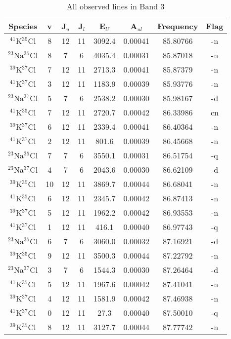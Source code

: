 \begin{table*}[htp]
\centering
\caption{All observed lines in Band 3}
\begin{tabular}{cccccccc}
\label{tab:all_detections_B3}
Species & v & J$_u$ & J$_l$ & E$_U$ & A$_{ul}$ & Frequency & Flag \\
\hline
$^{41}$K$^{35}$Cl & 8 & 12 & 11 & 3092.4 & 0.00041 & 85.80766 & -n \\
$^{23}$Na$^{35}$Cl & 8 & 7 & 6 & 4035.4 & 0.00031 & 85.87018 & -n \\
$^{39}$K$^{37}$Cl & 7 & 12 & 11 & 2713.3 & 0.00041 & 85.87379 & -n \\
$^{41}$K$^{37}$Cl & 3 & 12 & 11 & 1183.9 & 0.00039 & 85.93776 & -n \\
$^{23}$Na$^{37}$Cl & 5 & 7 & 6 & 2538.2 & 0.00030 & 85.98167 & -d \\
$^{41}$K$^{35}$Cl & 7 & 12 & 11 & 2720.7 & 0.00042 & 86.33986 & cn \\
$^{39}$K$^{37}$Cl & 6 & 12 & 11 & 2339.4 & 0.00041 & 86.40364 & -n \\
$^{41}$K$^{37}$Cl & 2 & 12 & 11 & 801.6 & 0.00039 & 86.45668 & -n \\
$^{23}$Na$^{35}$Cl & 7 & 7 & 6 & 3550.1 & 0.00031 & 86.51754 & -q \\
$^{23}$Na$^{37}$Cl & 4 & 7 & 6 & 2043.6 & 0.00030 & 86.62109 & -d \\
$^{39}$K$^{35}$Cl & 10 & 12 & 11 & 3869.7 & 0.00044 & 86.68041 & -n \\
$^{41}$K$^{35}$Cl & 6 & 12 & 11 & 2345.7 & 0.00042 & 86.87413 & -n \\
$^{39}$K$^{37}$Cl & 5 & 12 & 11 & 1962.2 & 0.00042 & 86.93553 & -n \\
$^{41}$K$^{37}$Cl & 1 & 12 & 11 & 416.1 & 0.00040 & 86.97743 & -q \\
$^{23}$Na$^{35}$Cl & 6 & 7 & 6 & 3060.0 & 0.00032 & 87.16921 & -d \\
$^{39}$K$^{35}$Cl & 9 & 12 & 11 & 3500.3 & 0.00044 & 87.22792 & -n \\
$^{23}$Na$^{37}$Cl & 3 & 7 & 6 & 1544.3 & 0.00030 & 87.26464 & -d \\
$^{41}$K$^{35}$Cl & 5 & 12 & 11 & 1967.6 & 0.00042 & 87.41041 & -n \\
$^{39}$K$^{37}$Cl & 4 & 12 & 11 & 1581.9 & 0.00042 & 87.46938 & -n \\
$^{41}$K$^{37}$Cl & 0 & 12 & 11 & 27.3 & 0.00040 & 87.50010 & -q \\
$^{39}$K$^{35}$Cl & 8 & 12 & 11 & 3127.7 & 0.00044 & 87.77742 & -n \\

\end{tabular}
\end{table*}
